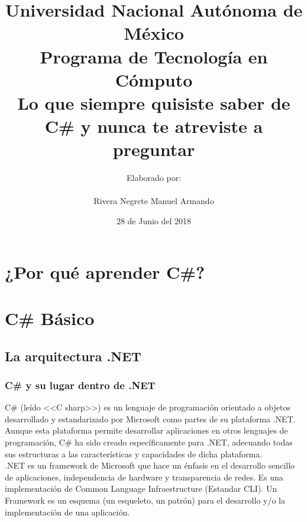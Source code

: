 \documentclass[12pt,a4paper]{report}
\author{Elaborado por:\\\\Rivera Negrete Manuel Armando}
\date{28 de Junio del 2018}
\title{Universidad Nacional Autónoma de México\\Programa de Tecnología en Cómputo\\Lo que siempre quisiste saber de C\# y nunca te atreviste a preguntar}
\begin{document}
\maketitle
\tableofcontents
\cleardoublepage
\part*{¿Por qué aprender C\#?}

\part{C\# Básico}

\chapter{La arquitectura .NET}
\section{C\# y su lugar dentro de .NET}
C\# (leído <<C sharp>>) es un lenguaje de programación orientado a objetos desarrollado y estandarizado por Microsoft como partes de su plataforma .NET. Aunque esta plataforma permite desarrollar aplicaciones en otros lenguajes de programación, C\# ha sido creado específicamente para .NET, adecuando todas sus estructuras a las características y capacidades de dicha plataforma.\\.NET es un framework de Microsoft que hace un énfasis en el desarrollo sencillo de aplicaciones, independencia de hardware y transparencia de redes. Es una implementación de Common Language Infraestructure (Estandar CLI). Un Framework es un esquema (un esqueleto, un patrón) para el desarrollo y/o la implementación de una aplicación.
\end{document}
